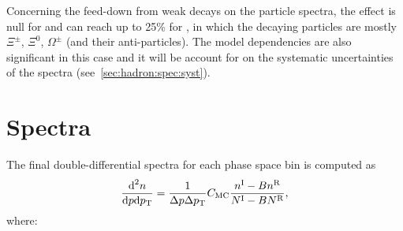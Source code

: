 Concerning the feed-down from weak decays on the \vzero particle
spectra, the effect is null for \kzeros and can reach up to 25\%
for \lambs, in which the decaying particles are mostly $\Xi^{\pm}$, $\Xi^0$,
$\Omega^\pm$ (and their anti-particles). The model dependencies are also
significant in this case and it will be account for
on the systematic uncertainties of the spectra (see~\cref{sec:hadron:spec:syst}).


\section{Spectra}
\label{sec:hadron:spec}

The final double-differential spectra for each
phase space bin is computed as
\begin{equation}
  \frac{\text{d}^2n}{\text{d}p\text{d}p_\text{T}} = \frac{1}{\Delta p\Delta p_\text{T}} \mbox{$C_\text{MC}$}
  \frac{n^\text{I}-Bn^\text{R}}{N^\text{I}-BN^\text{R}},
  \label{eq:hadron:spec}
\end{equation}
where:
